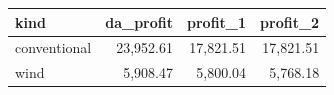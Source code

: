 \begin{tabular}{lrrr}
\toprule
kind & da\_profit & profit\_1 & profit\_2 \\
\midrule
conventional & 23,952.61 & 17,821.51 & 17,821.51 \\
wind & 5,908.47 & 5,800.04 & 5,768.18 \\
\bottomrule
\end{tabular}
